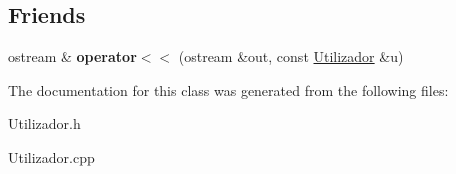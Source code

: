 \subsection*{Friends}
\begin{DoxyCompactItemize}
\item 
\hypertarget{class_utilizador_ad02a468bf3828d06a96b41947147c754}{}ostream \& {\bfseries operator$<$$<$} (ostream \&out, const \hyperlink{class_utilizador}{Utilizador} \&u)\label{class_utilizador_ad02a468bf3828d06a96b41947147c754}

\end{DoxyCompactItemize}


The documentation for this class was generated from the following files\+:\begin{DoxyCompactItemize}
\item 
Utilizador.\+h\item 
Utilizador.\+cpp\end{DoxyCompactItemize}
